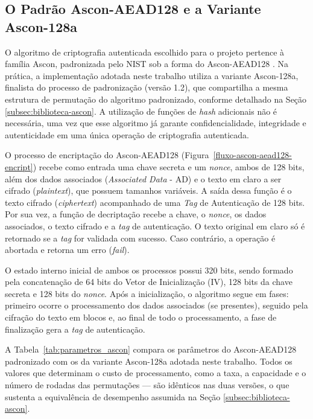 
\subsection{O Padrão Ascon-AEAD128 e a Variante Ascon-128a}
O algoritmo de criptografia autenticada escolhido para o projeto pertence à família Ascon, padronizada pelo NIST sob a forma do Ascon-AEAD128 \cite{nist2025ascon}. Na prática, a implementação adotada neste trabalho utiliza a variante Ascon-128a, finalista do processo de padronização (versão 1.2), que compartilha a mesma estrutura de permutação do algoritmo padronizado, conforme detalhado na Seção \ref{subsec:biblioteca-ascon}. A utilização de funções de \textit{hash} adicionais não é necessária, uma vez que esse algoritmo já garante confidencialidade, integridade e autenticidade em uma única operação de criptografia autenticada.

O processo de encriptação do Ascon-AEAD128 (Figura~\ref{fluxo-ascon-aead128-encript}) recebe como entrada uma chave secreta e um \textit{nonce}, ambos de 128 bits, além dos dados associados (\textit{Associated Data} - AD) e o texto em claro a ser cifrado (\textit{plaintext}), que possuem tamanhos variáveis. A saída dessa função é o texto cifrado (\textit{ciphertext}) acompanhado de uma \textit{Tag} de Autenticação de 128 bits. Por sua vez, a função de decriptação recebe a chave, o \textit{nonce}, os dados associados, o texto cifrado e a \textit{tag} de autenticação. O texto original em claro só é retornado se a \textit{tag} for validada com sucesso. Caso contrário, a operação é abortada e retorna um erro (\textit{fail}).

O estado interno inicial de ambos os processos possui 320 bits, sendo formado pela concatenação de 64 bits do Vetor de Inicialização (IV), 128 bits da chave secreta e 128 bits do \textit{nonce}. Após a inicialização, o algoritmo segue em fases: primeiro ocorre o processamento dos dados associados (se presentes), seguido pela cifração do texto em blocos e, ao final de todo o processamento, a fase de finalização gera a \textit{tag} de autenticação.

A Tabela~\ref{tab:parametros_ascon} compara os parâmetros do Ascon-AEAD128 padronizado com os da variante Ascon-128a adotada neste trabalho. Todos os valores que determinam o custo de processamento, como a taxa, a capacidade e o número de rodadas das permutações — são idênticos nas duas versões, o que sustenta a equivalência de desempenho assumida na Seção \ref{subsec:biblioteca-ascon}.

